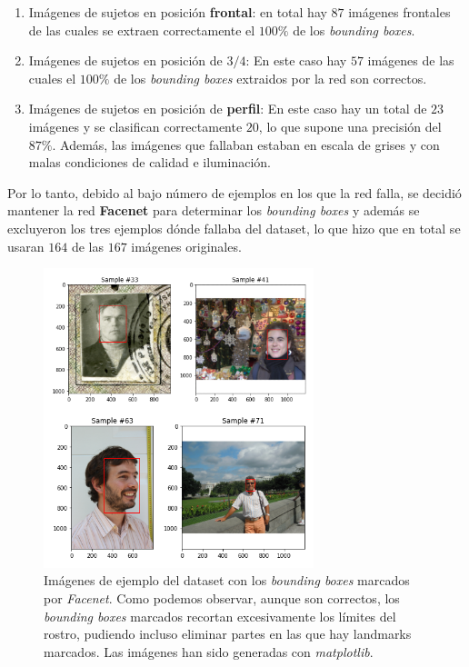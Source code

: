             \begin{enumerate}
                \item Imágenes de sujetos en posición \textbf{ frontal}: en total hay $87$ imágenes frontales de las cuales se extraen correctamente el \textbf{$100\%$} de los \textit{bounding boxes}.
                \item Imágenes de sujetos en posición de \textbf{$3/4$}: En este caso hay $57$ imágenes de las cuales el \textbf{$100\%$} de los \textit{bounding boxes} extraidos por la red son correctos.
                \item Imágenes de sujetos en posición de \textbf{perfil}: En este caso hay un total de $23$ imágenes y se clasifican correctamente $20$, lo que supone una precisión del \textbf{$87\%$}. Además, las imágenes que fallaban estaban en escala de grises y con malas condiciones de calidad e iluminación.
            \end{enumerate}

            \noindent Por lo tanto, debido al bajo número de ejemplos en los que la red falla, se decidió mantener la red \textbf{Facenet} para determinar los \textit{bounding boxes} y además se excluyeron los tres ejemplos dónde fallaba del dataset, lo que hizo que en total se usaran $164$ de las $167$ imágenes originales.

            \medskip 

            \begin{figure}[H]
                \centering
                \includegraphics[width=0.7\textwidth]{img/imagenes_ejemplo_bb.png}
                \caption{Imágenes de ejemplo del dataset con los \textit{bounding boxes} marcados por \textit{Facenet}. Como podemos observar, aunque son correctos, los \textit{bounding boxes} marcados recortan excesivamente los límites del rostro, pudiendo incluso eliminar partes en las que hay landmarks marcados. Las imágenes han sido generadas con \textit{matplotlib}.}
                \label{fig:Ejemplo_bb}
            \end{figure}

